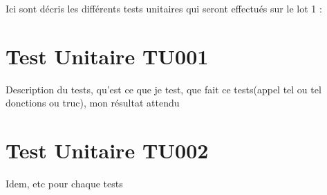 Ici sont décris les différents tests unitaires qui seront effectués sur le lot 1 :

\section{Test Unitaire TU001}
Description du tests, qu'est ce que je test, que fait ce tests(appel tel ou tel donctions ou truc), mon résultat attendu

\section{Test Unitaire TU002}
Idem, etc pour chaque tests	